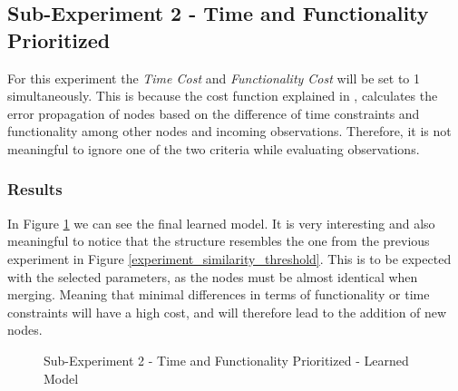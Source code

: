 \newpage

\subsection{Sub-Experiment 2 - Time and Functionality Prioritized}
For this experiment the \textit{Time Cost} and \textit{Functionality Cost} will be set to 1 simultaneously. This is because the cost function explained in , calculates the error propagation of nodes based on the difference of time constraints and functionality among other nodes and incoming observations. Therefore, it is not meaningful to ignore one of the two criteria while evaluating observations. 

\subsubsection{Results}
In Figure \ref{time_func_experiment} we can see the final learned model. It is very interesting and also meaningful to notice that the structure resembles the one from the previous experiment in Figure \ref{experiment_similarity_threshold}. This is to be expected with the selected parameters, as the nodes must be almost identical when merging. Meaning that minimal differences in terms of functionality or time constraints will have a high cost, and will therefore lead to the addition of new nodes.

\begin{figure}[h]
	\centering
	\caption{Sub-Experiment 2 - Time and Functionality Prioritized - Learned Model}
	\label{time_func_experiment}
\end{figure}

